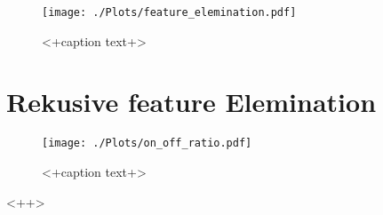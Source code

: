 \begin{figure}[H]
  \centering
  \texttt{[image: ./Plots/feature\_elemination.pdf]}
  \caption{<+caption text+>}
  \label{fig:<+label+>}
\end{figure}

\section{Rekusive feature Elemination}
\begin{figure}[H]
  \centering
  \texttt{[image: ./Plots/on\_off\_ratio.pdf]}
  \caption{<+caption text+>}
  \label{fig:<+label+>}
\end{figure}<++>
